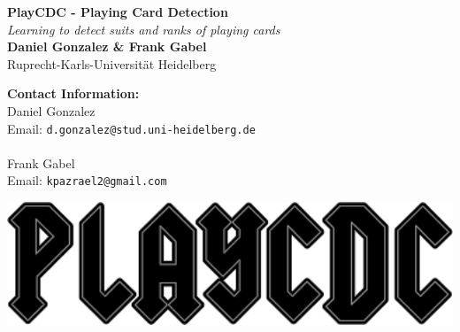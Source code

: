 \documentclass[a0,landscape]{a0poster}
\begin{document}


\begin{minipage}[b]{0.48\linewidth}
\veryHuge \color{NavyBlue} \textbf{PlayCDC - Playing Card Detection} \color{Black}\\ %
\Huge\textit{Learning to detect suits and ranks of playing cards}\\[1cm] %
\huge \textbf{Daniel Gonzalez \& Frank Gabel}\\ %
\huge Ruprecht-Karls-Universit\"at Heidelberg
\\ %
\end{minipage}
%
\begin{minipage}[b]{0.27\linewidth}
\color{DarkSlateGray}\Large \textbf{Contact Information:}\\
Daniel Gonzalez\\ %
Email: \texttt{d.gonzalez@stud.uni-heidelberg.de}\
\\\\
Frank Gabel \\
Email: \texttt{kpazrael2@gmail.com}\\ %
\end{minipage}
%
\begin{minipage}[b]{0.45\linewidth}

\includegraphics[width=30cm]{playcdc.png} \vspace{3cm}%
\end{minipage}
\end{document}
